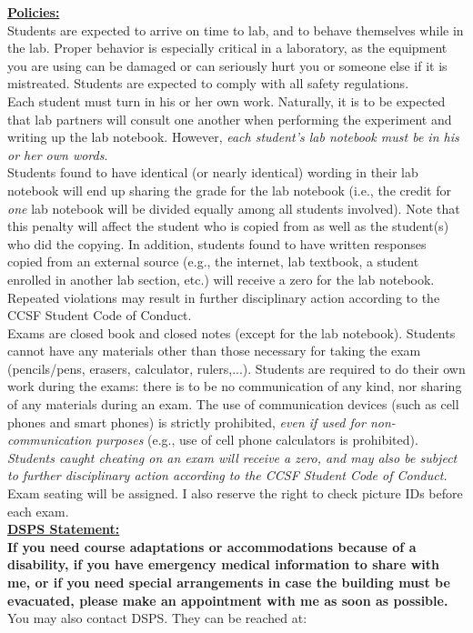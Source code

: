 \documentclass[12pt]{amsart}
\begin{document}
\textbf{\underline{Policies:}}\\
Students are expected to arrive on time to lab, and to behave themselves while in the
lab. Proper behavior is especially critical in a laboratory, as the equipment you are using
can be damaged or can seriously hurt you or someone else if it is mistreated. Students are
expected to comply with all safety regulations.\\
Each student must turn in his or her own work. Naturally, it is to be expected that lab
partners will consult one another when performing the experiment and writing up the lab
notebook. However, \textit{each student’s lab notebook must be in his or her own words}.\\
Students found to have identical (or nearly identical) wording in their lab notebook will
end up sharing the grade for the lab notebook (i.e., the credit for \textit{one} lab notebook will
be divided equally among all students involved). Note that this penalty will affect the
student who is copied from as well as the student(s) who did the copying. In addition,
students found to have written responses copied from an external source (e.g., the internet,
lab textbook, a student enrolled in another lab section, etc.) will receive a zero for the lab notebook. Repeated violations may result in further disciplinary action according to the
CCSF Student Code of Conduct.\\
Exams are closed book and closed notes (except for the lab notebook). Students cannot
have any materials other than those necessary for taking the exam (pencils/pens, erasers,
calculator, rulers,...). Students are required to do their own work during the exams: there
is to be no communication of any kind, nor sharing of any materials during an exam. The use
of communication devices (such as cell phones and smart phones) is strictly prohibited, \textit{even
if used for non-communication purposes} (e.g., use of cell phone calculators is prohibited).
\textit{Students caught cheating on an exam will receive a zero, and may also be subject to further
disciplinary action according to the CCSF Student Code of Conduct.} Exam seating will be
assigned. I also reserve the right to check picture IDs before each exam.\\
\textbf{\underline{DSPS Statement:}}\\ \textbf{If you need course adaptations or accommodations because of a disability,
if you have emergency medical information to share with me, or if you need
special arrangements in case the building must be evacuated, please make an
appointment with me as soon as possible.}\\ You may also contact DSPS. They can be reached at: 
\end{document}

